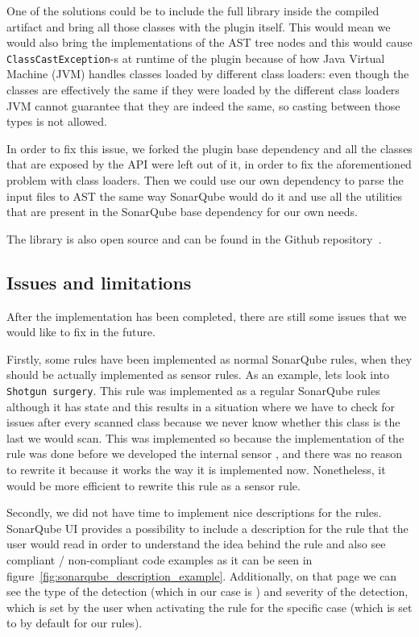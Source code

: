 One of the solutions could be to include the full library inside the compiled artifact and bring all those classes with
the plugin itself.
This would mean we would also bring the implementations of the AST tree nodes and this would cause
\verb|ClassCastException|-s at runtime of the plugin because of how Java Virtual Machine (JVM) handles classes loaded
by different class loaders: even though the classes are effectively the same if they were loaded by the different class loaders
JVM cannot guarantee that they are indeed the same, so casting between those types is not allowed.

In order to fix this issue, we forked the plugin base dependency and all the classes
that are exposed by the API were left out of it, in order to fix the aforementioned problem with class loaders.
Then we could use our own dependency to parse the input files to AST the same way SonarQube would do it
and use all the utilities that are present in the SonarQube base dependency for our own needs.

The library is also open source and can be found in the Github repository~\cite{sonar_java_extracted}.

\subsection{Issues and limitations}\label{subsec:issues-and-limitations}


After the implementation has been completed, there are still some issues that we would like to fix in the future.

Firstly, some rules have been implemented as normal SonarQube rules, when they should be actually implemented as sensor rules.
As an example, lets look into \verb|Shotgun surgery|.
This rule was implemented as a regular SonarQube rules although it has state and this results in a situation where
we have to check for issues after every scanned class because we never know whether this class is the last we would scan.
This was implemented so because the implementation of the rule was done before we developed the internal sensor ,
and there was no reason to rewrite it because it works the way it is implemented now.
Nonetheless, it would be more efficient to rewrite this rule as a sensor rule.

Secondly, we did not have time to implement nice descriptions for the rules.
SonarQube UI provides a possibility to include a description for the rule that the user would read in order
to understand the idea behind the rule and also see compliant / non-compliant code examples as it can be seen
in figure~\ref{fig:sonarqube_description_example}.
Additionally, on that page we can see the type of the detection (which in our case is ) and
severity of the detection, which is set by the user when activating the rule for the specific case (which is set to  by default for our rules).

